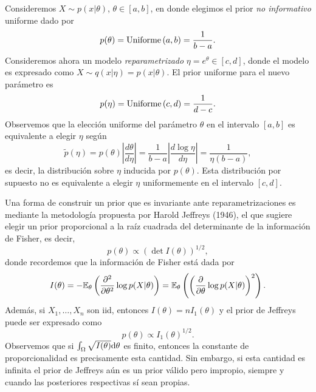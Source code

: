 Consideremos $X\sim p(x|\theta)$, $\theta\in [a,b]$, en donde elegimos el prior \textit{no informativo} uniforme dado por 
\begin{equation}
	p(\theta) =\text{Uniforme}\left(a,b\right) = \frac{1}{b-a}.
\end{equation}
Consideremos ahora un modelo \textit{reparametrizado} $\eta = e^\theta\in[c,d]$, donde el modelo es expresado como $X\sim q(x|\eta) = p(x|\theta) $. El prior uniforme para el nuevo parámetro es
\begin{equation}
	p(\eta) =\text{Uniforme}\left(c,d\right) = \frac{1}{d-c}.
\end{equation}
Observemos que la elección uniforme del parámetro $\theta$ en el intervalo $[a,b]$ es equivalente a elegir $\eta$ según
\begin{equation}
	\tilde{p}(\eta) = p(\theta) \left|\frac{d\theta}{d\eta}\right| = \frac{1}{b-a}\left|\frac{d\log\eta}{d\eta}\right|= \frac{1}{\eta (b-a)},
\end{equation}
es decir, la distribución sobre $\eta$ inducida por $p(\theta)$. Esta distribución por supuesto no es equivalente a elegir $\eta$ uniformemente en el intervalo $[c,d]$. 

Una forma de construir un prior que es invariante ante reparametrizaciones es mediante la metodología propuesta por  Harold Jeffreys (1946), el que sugiere elegir un prior proporcional a la raíz cuadrada del determinante de la información de Fisher, es decir,  
\begin{equation}
	p(\theta) \propto \left( \det I(\theta)\right)^{1/2},
\end{equation}
donde recordemos que la información de Fisher está dada por 
\begin{equation}
	I(\theta) = -\mathbb{E}_\theta \left(\frac{\partial^2}{\partial\theta^2}\log p(X|\theta)\right) = \mathbb{E}_\theta \left(\left(\frac{\partial}{\partial\theta}\log p(X|\theta)\right)^2\right).
\end{equation}
Además, si $X_1,\ldots,X_n$ son iid, entonces $I(\theta) = n I_1(\theta)$ y el prior de Jeffreys puede ser expresado como 
\begin{equation}
	p(\theta) \propto  I_1(\theta)^{1/2}.
\end{equation}
Observemos que si $\int_\Omega\sqrt{I(\theta)}{\text{d}}\theta$ es finito, entonces la constante de proporcionalidad es precisamente esta cantidad. Sin embargo, si esta cantidad es infinita el prior de Jeffreys aún es un prior válido pero impropio, siempre y cuando las posteriores respectivas sí sean propias. 

